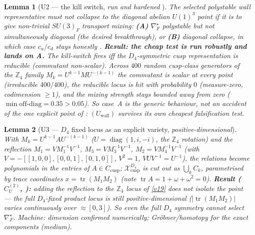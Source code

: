 \documentclass[11pt,a4paper]{article}
\newcommand{\Z}{\mathbb Z}
\newtheorem{lemma}{Lemma}
\begin{document}
\begin{lemma}[U2 --- the kill switch, \emph{run and hardened} \mE]
The selected polystable wall representative must \emph{not} collapse to the diagonal abelian $U(1)^3$
point if it is to give non-trivial $SU(3)_F$ transport mixing: \textbf{(A)} $\nabla_F^\star$ polystable but
\emph{not} simultaneously diagonal (the desired breakthrough), or \textbf{(B)} diagonal collapse, in which
case $c_u/c_d$ stays honestly \mC. \textbf{Result: the cheap test is run robustly and lands on A.} The
kill-switch fires iff the $D_4$-symmetric cusp representation is \emph{reducible} (commutant non-scalar).
Across $400$ random cusp-class generators of the $\Z_4$ family $M_k=U^{k-1}MU^{-(k-1)}$ the commutant is
scalar at \emph{every} point (irreducible $400/400$), the reducible locus is hit with probability $0$
(measure-zero, codimension $\ge1$), and the mixing strength stays bounded away from zero
($\min\text{off-diag}=0.35>0.05$). So case~A is the \emph{generic} behaviour, not an accident of the one
explicit point of : $(U_{\mathrm{wall}})$ \emph{survives} its own
cheapest falsification test. 
\end{lemma}

\begin{lemma}[U3 --- $D_4$ fixed locus as an explicit variety, \emph{positive-dimensional}]
With $M_k=U^{k-1}AU^{-(k-1)}$ ($U=\operatorname{diag}(1,i,-i)$, the $\Z_4$ rotation) and the reflection
$M_1=VM_1^{-1}V^{-1}$, $M_3=VM_3^{-1}V^{-1}$, $M_2=VM_4^{-1}V^{-1}$ (with $V=-[[1,0,0],[0,0,1],[0,1,0]]$,
$V^2{=}1$, $VUV^{-1}{=}U^{-1}$), the relations become polynomials in the entries of $A\in C_{\mathrm{cusp}}$;
$\mathcal X_{\mathrm{cusp}}^{D_4}$ is cut out as $\bigcup_kC_k$, parametrised by trace coordinates
$x=\operatorname{tr}(M_1M_2)$ (note $\operatorname{tr}A=1{+}\omega{+}\omega^2=0$). \textbf{Result
($C_U^{(2)}$, ):} adding the reflection to the $\Z_4$ locus of \vref{v19} does
\emph{not} isolate the point --- the \emph{full} $D_4$-fixed product locus is still
\emph{positive-dimensional} ($|\operatorname{tr}(M_1M_2)|$ varies continuously over $\approx[0,3]$). So even
the full $D_4$ symmetry cannot select $\nabla_F^\star$. \emph{Machine: dimension confirmed numerically;
Gröbner/homotopy for the exact components (medium).}
\end{lemma}
\end{document}
